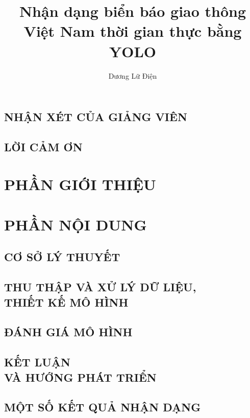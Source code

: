 \documentclass[a4paper,12pt,oneside]{report}
\title{Nhận dạng biển báo giao thông Việt Nam thời gian thực bằng YOLO}  %
\author{Dương Lữ Điện}                                      %
\begin{document}


\chapter*{NHẬN XÉT CỦA GIẢNG VIÊN}


\chapter*{LỜI CẢM ƠN}


\tableofcontents
\listoffigures
\listoftables

\clearpage
{}          %



\part{PHẦN GIỚI THIỆU}


\part{PHẦN NỘI DUNG}

\chapter{CƠ SỞ LÝ THUYẾT}


\chapter{THU THẬP VÀ XỬ LÝ DỮ LIỆU,\\THIẾT KẾ MÔ HÌNH}


\chapter{ĐÁNH GIÁ MÔ HÌNH}


\chapter{KẾT LUẬN\\VÀ HƯỚNG PHÁT TRIỂN}


\begin{appendices}
  \chapter*{MỘT SỐ KẾT QUẢ NHẬN DẠNG}
  
\end{appendices}

{}

\end{document}
